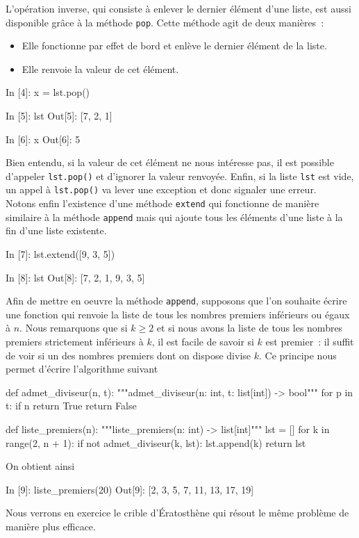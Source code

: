 \documentclass{magnolia}
\begin{document}
L'opération inverse, qui consiste à enlever le dernier élément d'une liste, est aussi disponible
grâce à la méthode \verb!pop!. Cette méthode agit de deux manières~:
\begin{itemize}
\item Elle fonctionne par effet de bord et enlève le dernier élément de la liste.
\item Elle renvoie la valeur de cet élément.
\end{itemize}
\begin{pythoncode}
In [4]: x = lst.pop()

In [5]: lst
Out[5]: [7, 2, 1]

In [6]: x
Out[6]: 5
\end{pythoncode}
Bien entendu, si la valeur de cet élément ne nous intéresse pas, il est possible d'appeler
\verb!lst.pop()! et d'ignorer la valeur renvoyée. Enfin, si la liste \verb!lst! est vide, un
appel à \verb!lst.pop()! va lever une exception et donc signaler une erreur.\\

Notons enfin l'existence d'une méthode \verb!extend! qui fonctionne de manière similaire
à la méthode \verb!append! mais qui ajoute tous les éléments d'une liste à la fin
d'une liste existente.
\begin{pythoncode}
In [7]: lst.extend([9, 3, 5])

In [8]: lst
Out[8]: [7, 2, 1, 9, 3, 5]
\end{pythoncode}
\vspace{2ex}

Afin de mettre en oeuvre la méthode \verb!append!,
supposons que l'on souhaite écrire une fonction qui renvoie la liste de tous
les nombres premiers inférieurs ou égaux à $n$. Nous remarquons que si $k\geq 2$ et si
nous avons la liste de tous les nombres premiers strictement inférieurs à $k$, il est
facile de savoir si $k$ est premier~: il suffit de voir si un des nombres premiers
dont on dispose divise $k$. Ce principe nous permet d'écrire l'algorithme suivant

\begin{pythoncode}
def admet_diviseur(n, t):
    """admet_diviseur(n: int, t: list[int]) -> bool"""
    for p in t:
        if n %
            return True
    return False

def liste_premiers(n):
    """liste_premiers(n: int) -> list[int]"""
    lst = []
    for k in range(2, n + 1):
        if not admet_diviseur(k, lst):
            lst.append(k)
    return lst
\end{pythoncode}
\noindent On obtient ainsi
\begin{pythoncode}
In [9]: liste_premiers(20)
Out[9]: [2, 3, 5, 7, 11, 13, 17, 19]
\end{pythoncode}
Nous verrons en exercice le crible d'Ératosthène qui résout le même problème de manière plus efficace.
\end{document}
